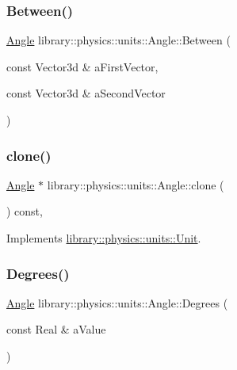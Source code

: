 \subsubsection{\texorpdfstring{Between()}{Between()}\hspace{0.1cm}{\footnotesize\ttfamily [2/2]}}
{\footnotesize\ttfamily \hyperlink{classlibrary_1_1physics_1_1units_1_1_angle}{Angle} library\+::physics\+::units\+::\+Angle\+::\+Between (\begin{DoxyParamCaption}\item[{const Vector3d \&}]{a\+First\+Vector,  }\item[{const Vector3d \&}]{a\+Second\+Vector }\end{DoxyParamCaption})\hspace{0.3cm}{\ttfamily [static]}}

\mbox{\label{classlibrary_1_1physics_1_1units_1_1_angle_add51af263128e384d3d89827d0f70dcf}} 
\subsubsection{\texorpdfstring{clone()}{clone()}}
{\footnotesize\ttfamily \hyperlink{classlibrary_1_1physics_1_1units_1_1_angle}{Angle} $\ast$ library\+::physics\+::units\+::\+Angle\+::clone (\begin{DoxyParamCaption}{ }\end{DoxyParamCaption}) const\hspace{0.3cm}{\ttfamily [override]}, {\ttfamily [virtual]}}



Implements \hyperlink{classlibrary_1_1physics_1_1units_1_1_unit_aff727141d73acddfae382e5e375f4640}{library\+::physics\+::units\+::\+Unit}.

\mbox{\label{classlibrary_1_1physics_1_1units_1_1_angle_a20b061534d7d24f807781a06b191603b}} 
\subsubsection{\texorpdfstring{Degrees()}{Degrees()}}
{\footnotesize\ttfamily \hyperlink{classlibrary_1_1physics_1_1units_1_1_angle}{Angle} library\+::physics\+::units\+::\+Angle\+::\+Degrees (\begin{DoxyParamCaption}\item[{const Real \&}]{a\+Value }\end{DoxyParamCaption})\hspace{0.3cm}{\ttfamily [static]}}

